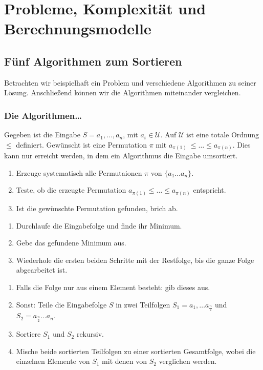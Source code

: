 \chapter{Probleme, Komplexität und Berechnungsmodelle}
\section{Fünf Algorithmen zum Sortieren}
Betrachten wir beispielhaft ein Problem und verschiedene Algorithmen zu seiner Lösung. Anschließend können wir die Algorithmen miteinander vergleichen.

\subsection{Die Algorithmen\dots}
\begin{Prob}
\hspace{\parindent}Gegeben ist die Eingabe $S = a_1, \ldots, a_n$, mit $a_i \in \mathcal{U}$. Auf $\mathcal{U}$ ist eine totale Ordnung $\le$ definiert.
Gewünscht ist eine Permutation $\pi$ mit $a_{\pi(1)}~\le \ldots \le a_{\pi(n)}$. Dies kann nur erreicht werden, in dem ein Algorithmus die Eingabe umsortiert.
\end{Prob}

\begin{Alg}[Bogosort]\label{Bogosort}
\begin{enumerate}
\item Erzeuge systematisch alle Permutaionen $\pi$ von $\{a_1 \ldots a_n\}$.
\item Teste, ob die erzeugte Permutation $a_{\pi(1)} \le \ldots \le a_{\pi(n)}$ entspricht.
\item Ist die gewünschte Permutation gefunden, brich ab.
\end{enumerate}
\end{Alg}

\begin{Alg}\label{Sortieren-durch-Auswahl}
\begin{enumerate}
\item Durchlaufe die Eingabefolge und finde ihr Minimum.
\item Gebe das gefundene Minimum aus.
\item Wiederhole die ersten beiden Schritte mit der Restfolge, bis die ganze Folge abgearbeitet ist.
\end{enumerate}
\end{Alg}

\begin{Alg}[Mergesort]\label{Mergesort}
\begin{enumerate}
\item Falls die Folge nur aus einem Element besteht: gib dieses aus.
\item Sonst: Teile die Eingabefolge $S$ in zwei Teilfolgen $S_1 = a_1, \ldots a_{\frac{n}{2}}$ und $S_2 = a_{\frac{n}{2}} \ldots a_n$.
\item Sortiere $S_1$ und $S_2$ rekursiv.
\item Mische beide sortierten Teilfolgen zu einer sortierten Gesamtfolge, wobei die einzelnen Elemente von $S_1$ mit denen von $S_2$ verglichen werden.
\end{enumerate}
\end{Alg}

